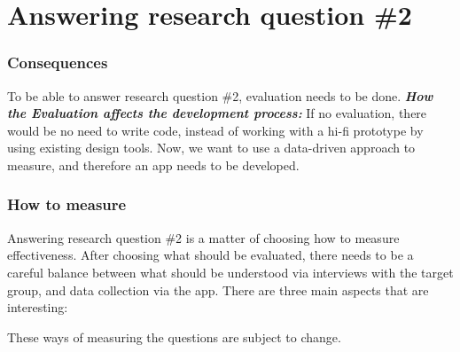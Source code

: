 \section{Answering research question \#2}

\subsubsection{Consequences}

To be able to answer research question \#2, evaluation needs to be done. \textbf{\textit{How the Evaluation affects the development process: }} If no evaluation, there would be no need to write code, instead of working with a hi-fi prototype by using existing design tools. Now, we want to use a data-driven approach to measure, and therefore an app needs to be developed.\\

\subsubsection{How to measure}

Answering research question \#2 is a matter of choosing how to measure effectiveness. After choosing what should be evaluated, there needs to be a careful balance between what should be understood via interviews with the target group, and data collection via the app. There are three main aspects that are interesting:

These ways of measuring the questions are subject to change.


